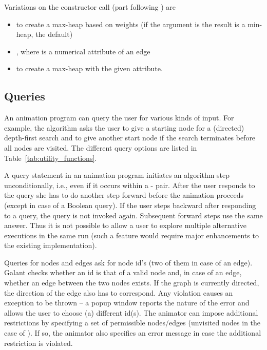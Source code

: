 Variations on the constructor call (part following ) are
\begin{itemize}
\item {} to create a max-heap based on weights
  (if the argument is  the result is a min-heap, the default)
\item {}, where  is a
  numerical attribute of an edge
\item {} to create a max-heap with
  the given attribute.
\end{itemize}


\subsection{Queries}

An animation program can query the user for various kinds of input.
For example, the  algorithm asks the user to give a
starting node for a (directed) depth-first search and to give another start
node if the search terminates before all nodes are visited. The different
query options are listed in Table~\ref{tab:utility_functions}.

A query statement in an animation program initiates an algorithm step
unconditionally, i.e., even if it occurs within a
- pair.
After the user responds to the query she has to do another step forward
before the animation proceeds (except in case of a Boolean query).
If the user steps backward after responding to a query, the query is not
invoked again. Subsequent forward steps use the same answer.
Thus it is not possible to allow a user to explore multiple alternative
executions in the same run (such a feature would require major enhancements
to the existing implementation).

Queries for nodes and edges ask for node id's (two of them in case of an
edge). Galant checks whether an id is that of a valid node and, in case of an
edge, whether an edge between the two nodes exists. If the graph is currently
directed, the direction of the edge also has to correspond. Any violation
causes an exception to be thrown -- a popup window reports the nature of the
error and allows the user to choose (a) different id(s).
The animator can impose additional restrictions by specifying a set of
permissible nodes/edges (unvisited nodes in the case of
). If so, the animator also specifies an error message
in case the additional restriction is violated.

